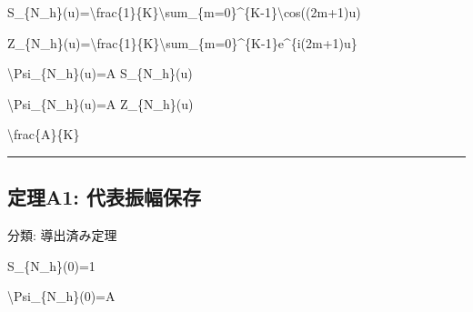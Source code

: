 \documentclass[
  a4paper,
]{ltjsarticle}
\newenvironment{Shaded}{}{}
\newcommand{\NormalTok}[1]{#1}
\begin{document}
\begin{Shaded}
\begin{Highlighting}[]
\NormalTok{S\_\{N\_h\}(u)=\textbackslash{}frac\{1\}\{K\}\textbackslash{}sum\_\{m=0\}\^{}\{K{-}1\}\textbackslash{}cos((2m+1)u)}
\end{Highlighting}
\end{Shaded}

\begin{Shaded}
\begin{Highlighting}[]
\NormalTok{Z\_\{N\_h\}(u)=\textbackslash{}frac\{1\}\{K\}\textbackslash{}sum\_\{m=0\}\^{}\{K{-}1\}e\^{}\{i(2m+1)u\}}
\end{Highlighting}
\end{Shaded}

\begin{Shaded}
\begin{Highlighting}[]
\NormalTok{\textbackslash{}Psi\_\{N\_h\}(u)=A S\_\{N\_h\}(u)}
\end{Highlighting}
\end{Shaded}

\begin{Shaded}
\begin{Highlighting}[]
\NormalTok{\textbackslash{}Psi\_\{N\_h\}(u)=A Z\_\{N\_h\}(u)}
\end{Highlighting}
\end{Shaded}

\begin{Shaded}
\begin{Highlighting}[]
\NormalTok{\textbackslash{}frac\{A\}\{K\}}
\end{Highlighting}
\end{Shaded}

\begin{center}\rule{0.5\linewidth}{0.5pt}\end{center}

\subsection{定理A1:
代表振幅保存}\label{ux5b9aux7406a1-ux4ee3ux8868ux632fux5e45ux4fddux5b58}

分類: 導出済み定理

\begin{Shaded}
\begin{Highlighting}[]
\NormalTok{S\_\{N\_h\}(0)=1}
\end{Highlighting}
\end{Shaded}

\begin{Shaded}
\begin{Highlighting}[]
\NormalTok{\textbackslash{}Psi\_\{N\_h\}(0)=A}
\end{Highlighting}
\end{Shaded}
\end{document}
